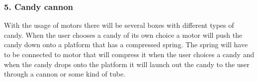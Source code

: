 \documentclass{article}
\begin{document}
\subsubsection*{5. Candy cannon}
With the usage of motors there will be several boxes with different types of candy. When the user chooses a candy of its own choice a motor will push the candy down onto a platform that has a compressed spring. The spring will have to be connected to motor that will compress it when the user choices a candy and when the candy drops onto the platform it will launch out the candy to the user through a cannon or some kind of tube.
\end{document}
